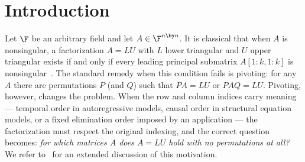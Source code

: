 \section{Introduction}\label{sec:intro}

Let $\F$ be an arbitrary field and let $A \in \F^{n \by n}$.  It is classical
that when $A$ is nonsingular, a factorization $A = LU$ with $L$ lower
triangular and $U$ upper triangular exists if and only if every leading
principal submatrix $A[1:k,1:k]$ is nonsingular~\cite{higham_gaussian_2011,golub_matrix_2013}.
The standard remedy when this condition fails is pivoting: for any $A$ there
are permutations $P$ (and $Q$) such that $PA = LU$ or $PAQ = LU$.  Pivoting,
however, changes the problem.  When the row and column indices carry meaning
--- temporal order in autoregressive models, causal order in structural
equation models, or a fixed elimination order imposed by an application ---
the factorization must respect the original indexing, and the correct
question becomes: \emph{for which matrices $A$ does $A = LU$ hold with no
permutations at all?}  We refer to~\cite{darve_lu_2026} for an extended
discussion of this motivation.

